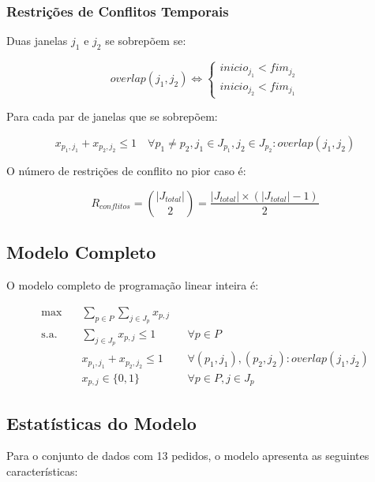 \documentclass[11pt,a4paper]{article}
\begin{document}
\subsubsection{Restrições de Conflitos Temporais}

Duas janelas $j_1$ e $j_2$ se sobrepõem se:

\begin{equation}
overlap(j_1, j_2) \Leftrightarrow \begin{cases}
inicio_{j_1} < fim_{j_2} \\
inicio_{j_2} < fim_{j_1}
\end{cases}
\end{equation}

Para cada par de janelas que se sobrepõem:

\begin{equation}
x_{p_1,j_1} + x_{p_2,j_2} \leq 1 \quad \forall p_1 \neq p_2, j_1 \in J_{p_1}, j_2 \in J_{p_2} : overlap(j_1, j_2)
\end{equation}

O número de restrições de conflito no pior caso é:

\begin{equation}
R_{conflitos} = \binom{|J_{total}|}{2} = \frac{|J_{total}| \times (|J_{total}| - 1)}{2}
\end{equation}

\subsection{Modelo Completo}

O modelo completo de programação linear inteira é:

\begin{align}
\max \quad & \sum_{p \in P} \sum_{j \in J_p} x_{p,j} \\
\text{s.a.} \quad & \sum_{j \in J_p} x_{p,j} \leq 1 && \forall p \in P \\
& x_{p_1,j_1} + x_{p_2,j_2} \leq 1 && \forall (p_1, j_1), (p_2, j_2) : overlap(j_1, j_2) \\
& x_{p,j} \in \{0, 1\} && \forall p \in P, j \in J_p
\end{align}

\subsection{Estatísticas do Modelo}

Para o conjunto de dados com 13 pedidos, o modelo apresenta as seguintes características:
\end{document}
